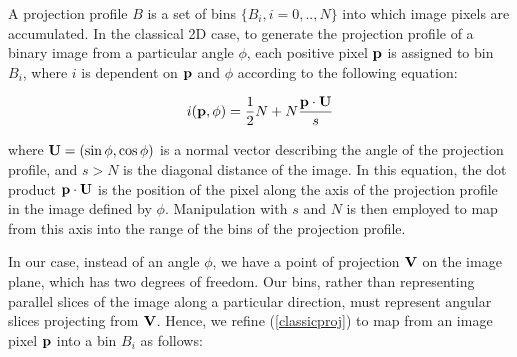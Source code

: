 
A projection profile $B$ is a set of bins $\{B_i, i=0,..,N\}$ into which image
pixels are accumulated.  In the classical 2D case, to generate the projection
profile of a binary image from a particular angle $\phi$, each positive pixel
${ \bf p }$ is assigned to bin $B_i$, where $i$ is dependent on ${ \bf p }$ and
$\phi$ according to the following equation:

\begin{equation} \label{classicproj} 
i({ \bf p },\phi) = \frac{1}{2} N + N
\frac{ { \bf p } \cdot { \bf U } }{ s } 
\end{equation}

{ \parindent 0mm where ${ \bf U }=(\sin \phi,\cos \phi)$ is a normal vector
describing the angle of the projection profile, and $s>N$ is the diagonal
distance of the image.  In this equation, the dot product ${ \bf p } \cdot
{ \bf U }$ is the position of the pixel along the axis of the projection profile
in the image defined by $\phi$.  Manipulation with $s$ and $N$ is then employed
to map from this axis into the range of the bins of the projection profile.  }



In our case, instead of an angle $\phi$, we have a point of projection
${ \bf V }$ on the image plane, which has two degrees of freedom.  Our bins,
rather than representing parallel slices of the image along a particular
direction, must represent angular slices projecting from ${ \bf V }$.  Hence, we
refine (\ref{classicproj}) to map from an image pixel ${ \bf p }$ into a bin
$B_i$ as follows:


